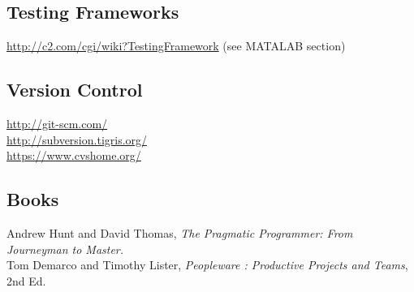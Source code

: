 \documentclass[twocolumn]{article}
\begin{document}
  \subsection{Testing Frameworks}  
  \url{http://c2.com/cgi/wiki?TestingFramework} (see MATALAB section)

  \subsection{Version Control}
  \url{http://git-scm.com/} \\
  \url{http://subversion.tigris.org/}\\
  \url{https://www.cvshome.org/}\

  \subsection{Books}
 Andrew Hunt and David Thomas,
 \textit{The Pragmatic Programmer: From Journeyman to Master.}\\
Tom Demarco and Timothy Lister,
\textit{Peopleware : Productive Projects and Teams}, 2nd Ed.
  
\end{document}
